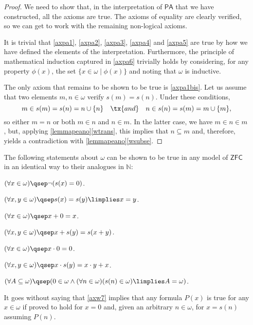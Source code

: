\begin{proof}
We need to show that, in the interpretation of $\mathsf{PA}$ that we have constructed, all the axioms are true.
The axioms of equality are clearly verified, so we can get to work with the remaining non-logical axioms.

It is trivial that \ref{axpa1}, \ref{axpa2}, \ref{axpa3}, \ref{axpa4} and \ref{axpa5} are true by how we have defined the elements of the interpretation. Furthermore, the principle of mathematical induction captured in \ref{axpa6} trivially holds by considering, for any property $\phi(x)$, the set $\{x\in \omega\mid \phi(x)\}$ and noting that $\omega$ is inductive.

The only axiom that remains to be shown to be true is \ref{axpa1bis}.
Let us assume that two elements $m,n\in \omega$ verify $s(m) = s(n)$.
Under these conditions,
\[ m\in s(m) = s(n) = n \cup \{n\} \quad \tx{and} \quad n\in s(n) = s(m) = m \cup \{m\},\]
so either $m = n$ or both $m\in n$ and $n\in m$. In the latter case, we have $m\in n \in m$, but, applying \ref{lemmapeano}\ref{wtrans}, this implies that $n\subseteq m$ and, therefore, yields a contradiction with \ref{lemmapeano}\ref{wsubse}.
\end{proof}

\begin{para}
The following statements about $\omega$ can be shown to be true in any model of $\mathsf{ZFC}$ in an identical way to their analogues in $\mathbb{N}$:
\begin{axioms}[$\omega$]
\item \label{axw1} $(\forall x\in \omega)\qsep\lnot(s(x) = 0)$.
\item \label{axw2} $(\forall x,y\in \omega)\qsep s(x) = s(y) \limplies x = y$.
\item \label{axw3} $(\forall x\in \omega)\qsep x + 0 = x$.
\item \label{axw4} $(\forall x,y\in \omega)\qsep x + s(y) = s(x+y)$.
\item \label{axw5} $(\forall x\in \omega)\qsep x \cdot 0 = 0$.
\item \label{axw6} $(\forall x,y\in \omega)\qsep x \cdot s(y) = x\cdot y + x$.
\item \label{axw7} $(\forall A \subseteq \omega)\qsep (0 \in \omega \land  (\forall n\in \omega) (s(n) \in \omega) \limplies A = \omega)$. 
\end{axioms}
It goes without saying that \ref{axw7} implies that any formula $P(x)$
is true for any $x\in \omega$ if proved to hold for $x = 0$ and, given an arbitrary $n\in \omega$, for $x = s(n)$ assuming $P(n)$.
\end{para}

